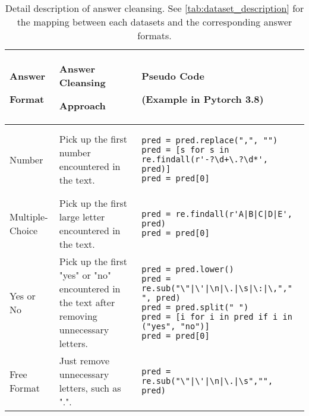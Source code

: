 \begin{table}[h]\centering
\caption{Detail description of answer cleansing. See \autoref{tab:dataset_description} for the mapping between each datasets and the corresponding answer formats.}
\label{tab:answer_cleansing}
\begin{tabular}{p{}p{}p{}}
\toprule
Answer \par Format &Answer Cleansing \par Approach &Pseudo Code \par (Example in Pytorch 3.8) \\\midrule \midrule
Number &Pick up the first number encountered in the text. &
\begin{lstlisting}
pred = pred.replace(",", "")
pred = [s for s in re.findall(r'-?\d+\.?\d*', pred)]
pred = pred[0] 
\end{lstlisting}

\\
\midrule

Multiple-Choice &Pick up the first large letter encountered in the text. &
\begin{lstlisting}
pred = re.findall(r'A|B|C|D|E', pred) 
pred = pred[0]
\end{lstlisting}

\\\midrule

Yes or No &Pick up the first "yes" or "no" encountered in the text after removing unnecessary letters. &
\begin{lstlisting}
pred = pred.lower()
pred = re.sub("\"|\'|\n|\.|\s|\:|\,"," ", pred) 
pred = pred.split(" ") 
pred = [i for i in pred if i in ("yes", "no")] 
pred = pred[0]
\end{lstlisting}

\\\midrule

Free Format &Just remove unnecessary letters, such as ".". &
\begin{lstlisting}
pred = re.sub("\"|\'|\n|\.|\s","", pred)
\end{lstlisting}

\\

\bottomrule
\end{tabular}
\end{table}